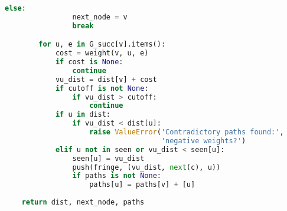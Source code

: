 \begin{lstlisting}[language=Python]
            else:
                next_node = v
                break

        for u, e in G_succ[v].items():
            cost = weight(v, u, e)
            if cost is None:
                continue
            vu_dist = dist[v] + cost
            if cutoff is not None:
                if vu_dist > cutoff:
                    continue
            if u in dist:
                if vu_dist < dist[u]:
                    raise ValueError('Contradictory paths found:',
                                     'negative weights?')
            elif u not in seen or vu_dist < seen[u]:
                seen[u] = vu_dist
                push(fringe, (vu_dist, next(c), u))
                if paths is not None:
                    paths[u] = paths[v] + [u]
    
    return dist, next_node, paths
\end{lstlisting}



